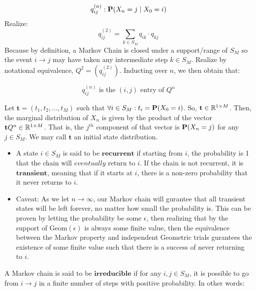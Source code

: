 $$ q_{ij}^{(n)}: \Prb(X_n = j \mid X_0 = i)$$
Realize:
$$q_{ij}^{(2)} = \sum_{k \in S_M} q_{ik}\cdot q_{kj}$$
Because by definition, a Markov Chain is closed under a support/range of $S_M$ so the event $i \to j$ may have taken any intermediate step $k \in S_M$. Realize by notational equivalence, $Q^2 = (q_{ij}^{(2)})$. Inducting over $n$, we then obtain that:

$$q_{ij}^{(n)} \text{ is the } (i,j) \text{ entry of } Q^n$$

\begin{definition} Let $\textbf{t} = (t_1,t_2,\dots,t_M)$ such that $\forall i \in S_M : t_i = \Prb(X_0 = i)$. So, $\textbf{t} \in \R^{1 \times M}$. Then, the marginal distribution of $X_n$ is given by the product of the vector $\textbf{t} Q^n \in \R^{1 \times M}$. That is, the $j^{th}$ component of that vector is $\P(X_n = j)$ for any $j \in S_M$. We may call $\textbf{t}$ an initial state distribution.
\end{definition}


\begin{itemize}
\item A state $i \in S_M$ is said to be $\textbf{recurrent}$ if starting from $i$, the probability is 1 that the chain will $\textit{eventually}$ return to $i$. If the chain is not recurrent, it is $\textbf{transient}$, meaning that if it starts at $i$, there is a non-zero probability that it never returns to $i$.

\item Caveat: As we let $n \to \infty$, our Markov chain will gurantee that all transient states will be left forever, no matter how small the probability is. This can be proven by letting the probability be some $\epsilon$, then realizing that by the support of $\text{Geom}(\epsilon)$ is always some finite value, then the equivalence between the Markov property and independent Geometric trials gurantees the existence of some finite value such that there is a success of never returning to $i$.
\end{itemize}

\begin{definition}[Reducibility] A Markov chain is said to be $\textbf{irreducible}$ if for any $i,j \in S_M$, it is possible to go from $i \to j$ in a finite number of steps with positive probability. In other words:
\end{definition}

